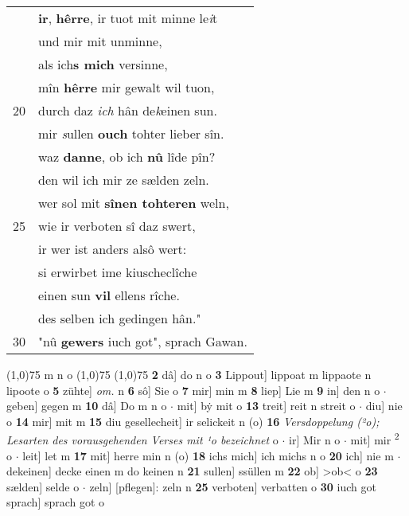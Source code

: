 \documentclass[8pt,a4paper,notitlepage]{article}
\begin{document}
\begin{table}[ht]
\begin{minipage}[t]{0.5\linewidth}
\begin{tabular}{rl}
 & \textbf{ir}, \textbf{hêrre}, ir tuot mit minne le\textit{i}t\\ 
 & und mir mit unminne,\\ 
 & als ich\textbf{s mich} versinne,\\ 
 & mîn \textbf{hêrre} mir gewalt wil tuon,\\ 
20 & durch daz \textit{ich} hân de\textit{k}einen sun.\\ 
 & mir \textit{s}ullen \textbf{ouch} tohter lieber sîn.\\ 
 & waz \textbf{danne}, ob ich \textbf{nû} lîde pîn?\\ 
 & den wil ich mir ze sælden zeln.\\ 
 & wer sol mit \textbf{sînen tohteren} weln,\\ 
25 & wie ir verboten sî daz swert,\\ 
 & ir wer ist anders alsô wert:\\ 
 & si erwirbet ime kiuscheclîche\\ 
 & einen sun \textbf{vil} ellens rîche.\\ 
 & des selben ich gedingen hân."\\ 
30 & "nû \textbf{gewers} iuch got", sprach Gawan.\\ 
\end{tabular}
\scriptsize
\line(1,0){75} \newline
m n o \newline
\line(1,0){75} \newline
\newline
\line(1,0){75} \newline
\textbf{2} dâ] do n o \textbf{3} Lippout] lippoat m lippaote n lipoote o \textbf{5} zühte] \textit{om.} n \textbf{6} sô] Sie o \textbf{7} mir] min m \textbf{8} liep] Lie m \textbf{9} in] den n o  $\cdot$ geben] gegen m \textbf{10} dâ] Do m n o  $\cdot$ mit] bẏ mit o \textbf{13} treit] reit n streit o  $\cdot$ diu] nie o \textbf{14} mir] mit m \textbf{15} diu gesellecheit] ir selickeit n (o) \textbf{16} \textit{Versdoppelung (²o); Lesarten des vorausgehenden Verses mit ¹o bezeichnet} o   $\cdot$ ir] Mir n o  $\cdot$ mit] mir \textsuperscript{2}\hspace{-1.3mm} o  $\cdot$ leit] let m \textbf{17} mit] herre min n (o) \textbf{18} ichs mich] ich michs n o \textbf{20} ich] nie m  $\cdot$ dekeinen] decke einen m do keinen n \textbf{21} sullen] ssüllen m \textbf{22} ob] >ob< o \textbf{23} sælden] selde o  $\cdot$ zeln] [pflegen]: zeln n \textbf{25} verboten] verbatten o \textbf{30} iuch got sprach] sprach got o \newline
\end{minipage}
\end{table}
\end{document}
